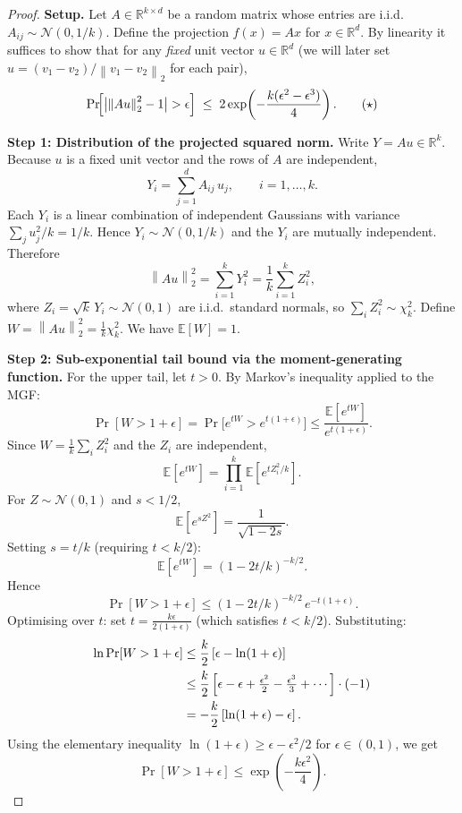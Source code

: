 \documentclass[11pt,a4paper]{article}
\theoremstyle{definition}
\newcommand{\R}{\mathbb{R}}
\newcommand{\norm}[1]{\left\lVert #1 \right\rVert}
\begin{document}
\begin{proof}
\textbf{Setup.}\;
Let $A \in \R^{k \times d}$ be a random matrix whose entries are
i.i.d.\ $A_{ij} \sim \mathcal{N}(0, 1/k)$.  Define the projection
$f(x) = Ax$ for $x \in \R^d$.  By linearity it suffices to show that
for any \emph{fixed} unit vector $u \in \R^d$ (we will later set
$u = (v_1 - v_2)/\norm{v_1 - v_2}_2$ for each pair),
\[
  \Pr\!\Bigl[\bigl|\norm{Au}_2^2 - 1\bigr| > \epsilon\Bigr]
  \;\leq\; 2\exp\!\left(-\frac{k(\epsilon^2 - \epsilon^3)}{4}\right).
  \tag{$\star$}
\]

\medskip
\textbf{Step 1: Distribution of the projected squared norm.}\;
Write $Y = Au \in \R^k$.  Because $u$ is a fixed unit vector and the
rows of $A$ are independent,
\[
  Y_i = \sum_{j=1}^{d} A_{ij}\, u_j, \qquad i = 1, \ldots, k.
\]
Each $Y_i$ is a linear combination of independent Gaussians with
variance $\sum_j u_j^2 / k = 1/k$.  Hence $Y_i \sim
\mathcal{N}(0, 1/k)$ and the $Y_i$ are mutually independent.
Therefore
\[
  \norm{Au}_2^2 = \sum_{i=1}^{k} Y_i^2
  = \frac{1}{k}\sum_{i=1}^{k} Z_i^2,
\]
where $Z_i = \sqrt{k}\, Y_i \sim \mathcal{N}(0,1)$ are i.i.d.\ standard
normals, so $\sum_i Z_i^2 \sim \chi^2_k$.  Define
$W = \norm{Au}_2^2 = \frac{1}{k}\chi^2_k$.  We have $\mathbb{E}[W] = 1$.

\medskip
\textbf{Step 2: Sub-exponential tail bound via the moment-generating
function.}\;
For the upper tail, let $t > 0$.  By Markov's inequality applied to the
MGF:
\[
  \Pr[W > 1 + \epsilon]
  = \Pr\!\bigl[e^{tW} > e^{t(1+\epsilon)}\bigr]
  \leq \frac{\mathbb{E}[e^{tW}]}{e^{t(1+\epsilon)}}.
\]
Since $W = \frac{1}{k}\sum_i Z_i^2$ and the $Z_i$ are independent,
\[
  \mathbb{E}[e^{tW}]
  = \prod_{i=1}^{k} \mathbb{E}\!\left[e^{t Z_i^2 / k}\right].
\]
For $Z \sim \mathcal{N}(0,1)$ and $s < 1/2$,
\[
  \mathbb{E}[e^{sZ^2}] = \frac{1}{\sqrt{1-2s}}.
\]
Setting $s = t/k$ (requiring $t < k/2$):
\[
  \mathbb{E}[e^{tW}] = (1 - 2t/k)^{-k/2}.
\]
Hence
\[
  \Pr[W > 1+\epsilon]
  \leq (1 - 2t/k)^{-k/2}\, e^{-t(1+\epsilon)}.
\]
Optimising over $t$: set $t = \frac{k\epsilon}{2(1+\epsilon)}$ (which
satisfies $t < k/2$).  Substituting:
\begin{align}
  \ln\Pr[W > 1+\epsilon]
  &\leq \frac{k}{2}\left[
    \epsilon - \ln(1+\epsilon)
  \right] \notag\\
  &\leq \frac{k}{2}\left[
    \epsilon - \epsilon + \tfrac{\epsilon^2}{2} - \tfrac{\epsilon^3}{3} + \cdots
  \right] \cdot (-1) \notag\\
  &= -\frac{k}{2}\left[
    \ln(1+\epsilon) - \epsilon
  \right]. \label{eq:jl-upper}
\end{align}
Using the elementary inequality $\ln(1+\epsilon) \geq \epsilon -
\epsilon^2/2$ for $\epsilon \in (0,1)$, we get
\[
  \Pr[W > 1+\epsilon] \leq \exp\!\left(-\frac{k\epsilon^2}{4}\right).
\]


\end{proof}
\end{document}
